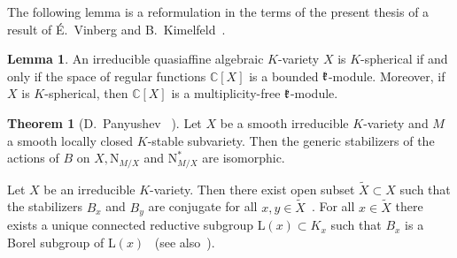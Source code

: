 \documentclass[12pt]{amsart}
\theoremstyle{definition}\newtheorem{theorem}{Theorem}[section]
\newtheorem{lemma}[proposition]{Lemma}
\theoremstyle{definition}\newtheorem{definition}[proposition]{Definition}
\theoremstyle{remark}\newtheorem{example}[proposition]{Example}
\begin{document}
The following lemma is a reformulation in the terms of the present thesis of a result of \'E.~Vinberg and B.~Kimelfeld~\cite[Thm.~2]{VK}.
\begin{lemma}An irreducible quasiaffine algebraic $K$-variety $X$ is $K$-spherical if and only if the space of regular functions $\mathbb C[X]$ is a bounded $\frak k$-module. Moreover, if $X$ is $K$-spherical, then $\mathbb C[X]$ is a multiplicity-free $\frak k$-module.\end{lemma}
\begin{theorem}[D.~Panyushev {~\cite[Thm 2.1]{Pan}}]\label{Pan}Let $X$ be a smooth irreducible $K$-variety and $M$ a smooth locally closed $K$-stable subvariety. Then the generic stabilizers of the actions of $B$ on $X,\mathrm N_{M/X}$ and $\mathrm N_{M/X}^*$ are isomorphic.\label{MPan}\end{theorem}
Let $X$ be an irreducible $K$-variety. Then there exist open subset $\tilde X\subset X$ such that the stabilizers $B_x$ and $B_y$ are conjugate for all $x,y\in \tilde X$~\cite{Pan}. For all $x\in\tilde X$ there exists a unique connected reductive subgroup L$(x)\subset K_x$ such that $B_x$ is a Borel subgroup of L$(x)$~\cite{Pan} (see also~\cite{Gr}).
\end{document}
